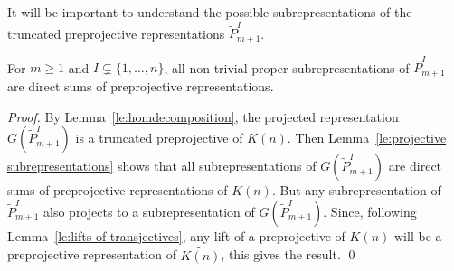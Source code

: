 \documentclass[smallextended,envcountsect,envcountsame]{svjour3}
\numberwithin{equation}{section}
\begin{document}
It will be important to understand the possible subrepresentations of the truncated preprojective representations $\tilde P_{m+1}^I$.
\begin{lemma}
  \label{le:subrep}
  For $m\ge1$ and $I\subsetneq\{1,\ldots,n\}$, all non-trivial proper subrepresentations of $\tilde P_{m+1}^I$ are direct sums of preprojective representations.	
\end{lemma}
\begin{proof}
  By Lemma~\ref{le:homdecomposition}, the projected representation $G(\tilde P_{m+1}^I)$ is a truncated preprojective of $K(n)$.
  Then Lemma~\ref{le:projective subrepresentations} shows that all subrepresentations of $G(\tilde P_{m+1}^I)$ are direct sums of preprojective representations of $K(n)$.
  But any subrepresentation of $\tilde P_{m+1}^I$ also projects to a subrepresentation of $G(\tilde P_{m+1}^I)$.
  Since, following Lemma~\ref{le:lifts of transjectives}, any lift of a preprojective of $K(n)$ will be a preprojective representation of $\widetilde{K(n)}$, this gives the result.
\qed\end{proof}
\end{document}
